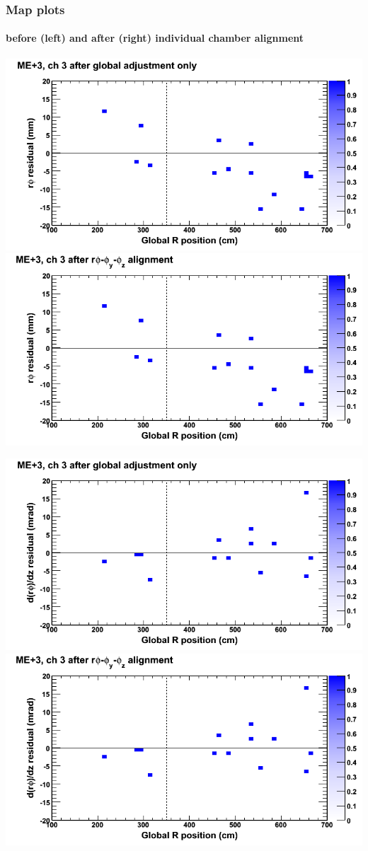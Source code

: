 \documentclass[compress]{beamer}
\begin{document}
\begin{frame}
\frametitle{Map plots}
\framesubtitle{before (left) and after (right) individual chamber alignment}
\includegraphics[width=0.5\linewidth]{ringmapplots_3dof/before_CSCvsr_mep3ch03_x.png} \includegraphics[width=0.5\linewidth]{ringmapplots_3dof/after_CSCvsr_mep3ch03_x.png}

\includegraphics[width=0.5\linewidth]{ringmapplots_3dof/before_CSCvsr_mep3ch03_dxdz.png} \includegraphics[width=0.5\linewidth]{ringmapplots_3dof/after_CSCvsr_mep3ch03_dxdz.png}
\end{frame}
\end{document}
